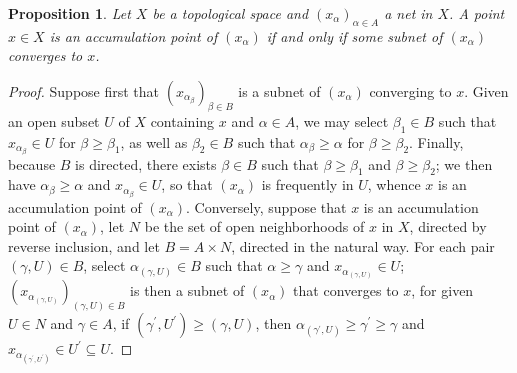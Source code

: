 \documentclass[12pt]{article}
\theoremstyle{plain}
\newtheorem*{prop*}{Proposition}
\begin{document}
\begin{prop*}
Let $X$ be a topological space and $(x_\alpha)_{\alpha\in A}$ a net in $X$. A point $x\in X$ 
is an accumulation point of $(x_\alpha)$ if and only if some subnet of $(x_\alpha)$ converges to $x$.
\end{prop*}
\begin{proof}
Suppose first that $(x_{\alpha_\beta})_{\beta\in B}$ is a subnet of $(x_\alpha)$ converging to $x$. Given an open subset $U$ of $X$ containing $x$ and $\alpha\in A$, we may select $\beta_1\in B$ such that $x_{\alpha_\beta}\in U$ for $\beta\geq\beta_1$, as well as $\beta_2\in B$ such that $\alpha_{\beta}\geq\alpha$ for $\beta\geq\beta_2$. Finally, because $B$ is directed, there exists $\beta\in B$ such that $\beta\geq\beta_1$ and $\beta\geq\beta_2$; we then have $\alpha_\beta\geq\alpha$ and $x_{\alpha_\beta}\in U$, so that $(x_\alpha)$ is frequently in $U$, whence $x$ is an accumulation point of $(x_\alpha)$. Conversely, suppose that $x$ is an accumulation point of $(x_\alpha)$, let $N$ be the set of open neighborhoods of $x$ in $X$, directed by reverse inclusion, and let $B=A\times N$, directed in the natural way. For each pair $(\gamma,U)\in B$, select $\alpha_{(\gamma,U)}\in B$ such that $\alpha\geq\gamma$ and $x_{\alpha_{(\gamma,U)}}\in U$; $(x_{\alpha_{(\gamma,U)}})_{(\gamma,U)\in B}$ is then a subnet of $(x_\alpha)$ that converges to $x$, for given $U\in N$ and $\gamma\in A$, if $(\gamma^\prime,U^\prime)\geq(\gamma,U)$, then $\alpha_{(\gamma^\prime,U)}\geq\gamma^\prime\geq\gamma$ and $x_{\alpha_{(\gamma^\prime,U^\prime)}}\in U^\prime\subseteq U$.
\end{proof}
\end{document}
